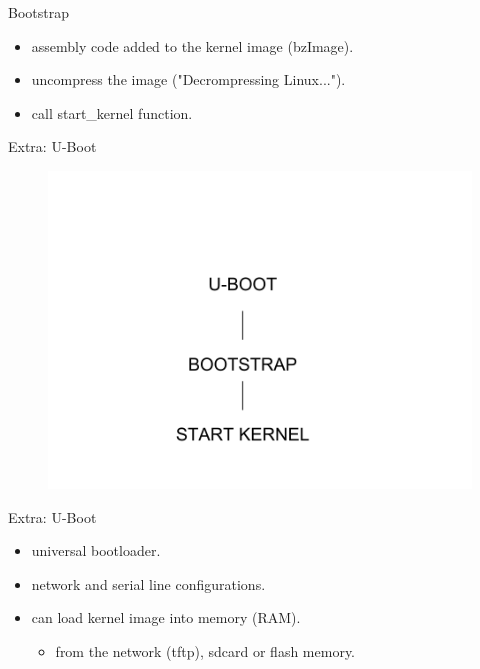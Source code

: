 \documentclass{workshop}
\begin{document}
\begin{frame}{Bootstrap}
\begin{itemize}
\item assembly code added to the kernel image (bzImage).
\item uncompress the image ("Decrompressing Linux...").
\item call start\_kernel function.
\end{itemize}
\end{frame}

\begin{frame}{Extra: U-Boot}
      \begin{figure}
         \includegraphics[scale=0.3]{img/u-boot.png}
      \end{figure}
\end{frame}

\begin{frame}{Extra: U-Boot}
\begin{itemize}
\item universal bootloader.
\item network and serial line configurations.
\item can load kernel image into memory (RAM).
  \begin{itemize}
  \item from the network (tftp), sdcard or flash memory.
  \end{itemize}
\end{itemize}
\end{frame}
\end{document}
